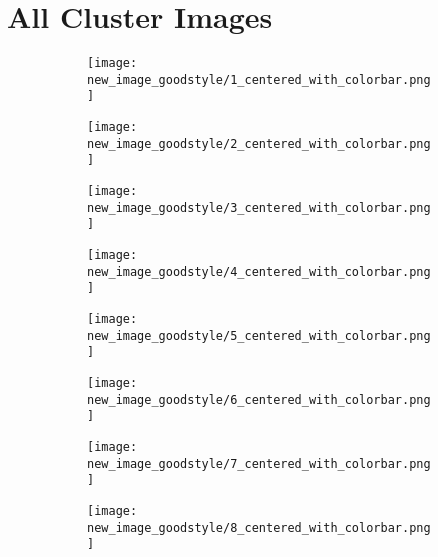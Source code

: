 \documentclass[a4paper,12pt]{article}
\begin{document}
\section*{All Cluster Images}
\begin{figure}[H]
  \begin{subfigure}{0.11\textwidth}
    \texttt{[image: new\_image\_goodstyle/1\_centered\_with\_colorbar.png]}
  \end{subfigure}
  \hfill
  \begin{subfigure}{0.11\textwidth}
    \texttt{[image: new\_image\_goodstyle/2\_centered\_with\_colorbar.png]}
  \end{subfigure}
  \hfill
  \begin{subfigure}{0.11\textwidth}
    \texttt{[image: new\_image\_goodstyle/3\_centered\_with\_colorbar.png]}
  \end{subfigure}
  \hfill
  \begin{subfigure}{0.11\textwidth}
    \texttt{[image: new\_image\_goodstyle/4\_centered\_with\_colorbar.png]}
  \end{subfigure}
  \hfill
  \begin{subfigure}{0.11\textwidth}
    \texttt{[image: new\_image\_goodstyle/5\_centered\_with\_colorbar.png]}
  \end{subfigure}
  \hfill
  \begin{subfigure}{0.11\textwidth}
    \texttt{[image: new\_image\_goodstyle/6\_centered\_with\_colorbar.png]}
  \end{subfigure}
  \hfill
  \begin{subfigure}{0.11\textwidth}
    \texttt{[image: new\_image\_goodstyle/7\_centered\_with\_colorbar.png]}
  \end{subfigure}
  \hfill
  \begin{subfigure}{0.11\textwidth}
    \texttt{[image: new\_image\_goodstyle/8\_centered\_with\_colorbar.png]}
  \end{subfigure}
  \hfill
\end{figure}
\end{document}
